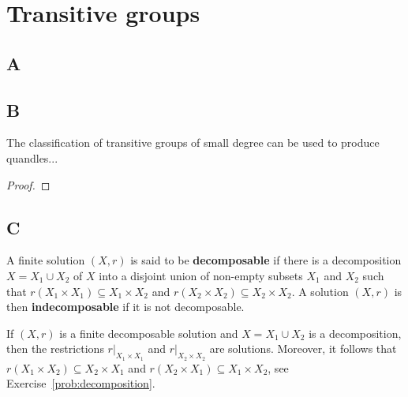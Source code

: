 \chapter{Transitive groups}


\section*{A}

\section*{B}

The classification of transitive groups of small degree 
can be used to produce quandles...

\begin{theorem}
\label{thm:quandles}

\end{theorem}

\begin{proof}

\end{proof}

\section*{C}

\begin{definition}
A finite solution $(X,r)$ is said to be \textbf{decomposable} if there is a 
decomposition $X=X_1\cup X_2$ of $X$ into a disjoint union of
non-empty subsets $X_1$ and $X_2$ such that 
$r(X_1\times X_1)\subseteq X_1\times X_2$ and $r(X_2\times X_2)\subseteq X_2\times X_2$. 
A solution $(X,r)$ is then \textbf{indecomposable} if it is not decomposable. 
\end{definition}

If $(X,r)$ is a finite decomposable solution and $X=X_1\cup X_2$ is a decomposition, then
the restrictions $r|_{X_1\times X_1}$ and $r|_{X_2\times X_2}$ are solutions. Moreover, 
it follows that $r(X_1\times X_2)\subseteq X_2\times X_1$ and 
$r(X_2\times X_1)\subseteq X_1\times X_2$, 
see Exercise~\ref{prob:decomposition}.


